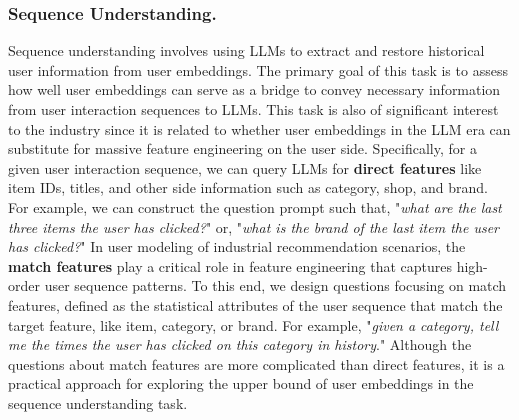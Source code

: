 
\subsubsection{\textbf{Sequence Understanding.}}
Sequence understanding involves using LLMs to extract and restore historical user information from user embeddings.
The primary goal of this task is to assess how well user embeddings can serve as a bridge to convey necessary information from user interaction sequences to LLMs.
This task is also of significant interest to the industry since it is related to whether user embeddings in the LLM era can substitute for massive feature engineering on the user side.
Specifically, for a given user interaction sequence, we can query LLMs for  \textbf{direct features} like item IDs, titles, and other side information such as category, shop, and brand.
For example, we can construct the question prompt such that, "\textit{what are the last three items the user has clicked?}" or, "\textit{what is the brand of the last item the user has clicked?}"
In user modeling of industrial recommendation scenarios, the \textbf{match features} play a critical role in feature engineering that captures high-order user sequence patterns.   
To this end, we design questions focusing on match features, defined as the statistical attributes of the user sequence that match the target feature, like item, category, or brand.
For example, "\textit{given a category, tell me the times the user has clicked on this category in history}." Although the questions about match features are more complicated than direct features, it is a practical approach for exploring the upper bound of user embeddings in the sequence understanding task.

